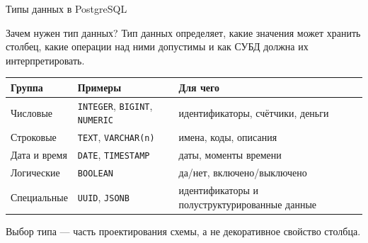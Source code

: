 \documentclass[aspectratio=169]{beamer}
\begin{document}
\begin{frame}{Типы данных в PostgreSQL}
\begin{block}{Зачем нужен тип данных?}
Тип данных определяет, какие значения может хранить столбец,
какие операции над ними допустимы и как СУБД должна их интерпретировать.
\end{block}

\vspace{0.3cm}
\small
\begin{table}
\centering
\begin{tabular}{p{}|p{}|p{}}
\toprule
\textbf{Группа} & \textbf{Примеры} & \textbf{Для чего}\\
\midrule
Числовые & \texttt{INTEGER}, \texttt{BIGINT}, \texttt{NUMERIC} & идентификаторы, счётчики, деньги\\
Строковые & \texttt{TEXT}, \texttt{VARCHAR(n)} & имена, коды, описания\\
Дата и время & \texttt{DATE}, \texttt{TIMESTAMP} & даты, моменты времени\\
Логические & \texttt{BOOLEAN} & да/нет, включено/выключено\\
Специальные & \texttt{UUID}, \texttt{JSONB} & идентификаторы и полуструктурированные данные\\
\bottomrule
\end{tabular}
\end{table}

\vspace{0.2cm}
\alert{Выбор типа — часть проектирования схемы, а не декоративное свойство столбца.}
\end{frame}
\end{document}
